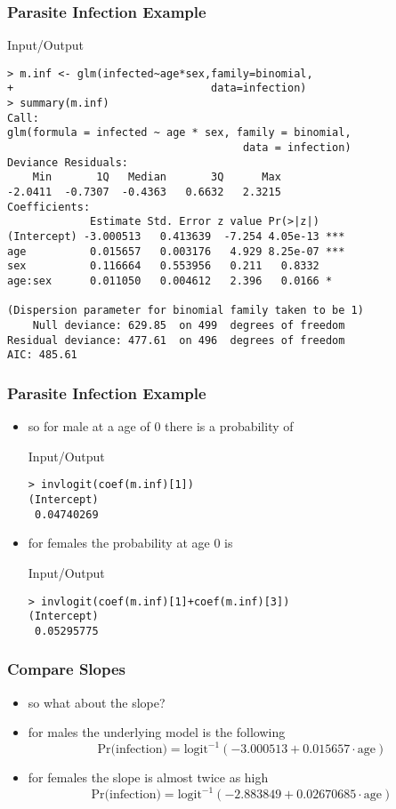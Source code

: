 \begin{frame}[fragile]\frametitle{Parasite Infection Example}\footnotesize
  \begin{exampleblock}{Input/Output}\scriptsize
\begin{verbatim}
> m.inf <- glm(infected~age*sex,family=binomial,
+                               data=infection)
> summary(m.inf)
Call:
glm(formula = infected ~ age * sex, family = binomial, 
                                     data = infection)
Deviance Residuals: 
    Min       1Q   Median       3Q      Max  
-2.0411  -0.7307  -0.4363   0.6632   2.3215  
Coefficients:
             Estimate Std. Error z value Pr(>|z|)    
(Intercept) -3.000513   0.413639  -7.254 4.05e-13 ***
age          0.015657   0.003176   4.929 8.25e-07 ***
sex          0.116664   0.553956   0.211   0.8332    
age:sex      0.011050   0.004612   2.396   0.0166 *  

(Dispersion parameter for binomial family taken to be 1)
    Null deviance: 629.85  on 499  degrees of freedom
Residual deviance: 477.61  on 496  degrees of freedom
AIC: 485.61
\end{verbatim}
  \end{exampleblock}

\end{frame}

\begin{frame}[fragile]\frametitle{Parasite Infection Example}
\begin{itemize}
\item so for male at a age of 0 there is a probability of
    \begin{exampleblock}{Input/Output}
\begin{verbatim}
> invlogit(coef(m.inf)[1])
(Intercept) 
 0.04740269 
\end{verbatim}
    \end{exampleblock}
  \item for females the probability at age 0 is
    \begin{exampleblock}{Input/Output}
\begin{verbatim}
> invlogit(coef(m.inf)[1]+coef(m.inf)[3])
(Intercept) 
 0.05295775 
\end{verbatim}
  \end{exampleblock}
\end{itemize}
\end{frame}


\begin{frame}[fragile]\frametitle{Compare Slopes}
\begin{itemize}
\item so what about the slope?
\item for males the underlying model is the following
$$\mbox{Pr(infection)}=\mbox{logit}^{-1}(-3.000513 + 0.015657 \cdot \mbox{age}) $$
\item for females the slope is almost twice as high
  $$\mbox{Pr(infection)}=\mbox{logit}^{-1}(-2.883849 + 0.02670685  \cdot \mbox{age}) $$
\end{itemize}
\end{frame}


